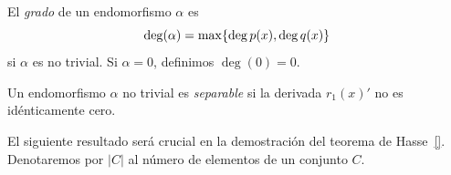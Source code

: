 \begin{definicion}
	El \emph{grado} de un endomorfismo $\alpha$ es
	$$
		\deg(\alpha)= \max \{ \deg p(x) , \deg q(x) \}
	$$
	si $\alpha$ es no trivial. Si $\alpha = 0$, definimos $\deg(0) = 0$.
\end{definicion}

\begin{definicion}
	Un endomorfismo $\alpha$ no trivial es \emph{separable} si la derivada $r_1(x)'$ no es idénticamente cero.

\end{definicion}

El siguiente resultado será crucial en la demostración del teorema de Hasse~\ref{}. Denotaremos por  $\left\vert{C}\right\vert$ al número de elementos de un conjunto $C$.


